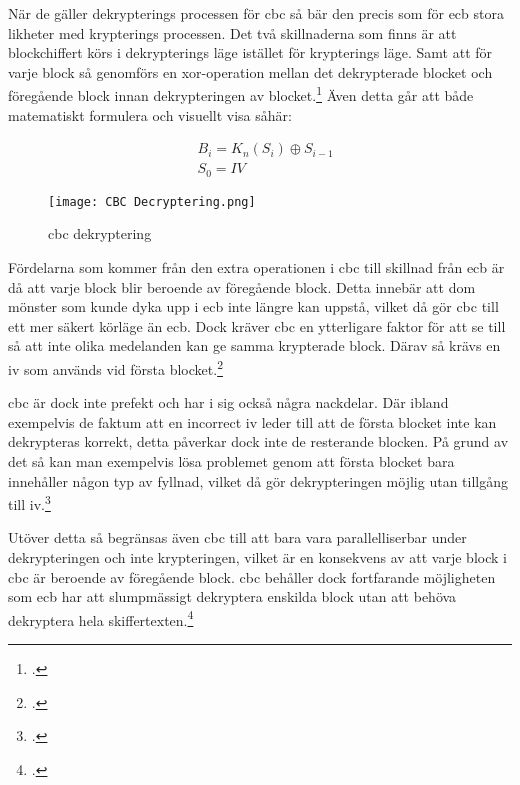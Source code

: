 När de gäller dekrypterings processen för \acrshort{cbc} så bär den precis som för
\acrshort{ecb} stora likheter med krypterings processen. Det två skillnaderna som
finns är att blockchiffert körs i dekrypterings läge istället för krypterings läge.
Samt att för varje block så genomförs en \gls{xor}-operation mellan det dekrypterade
blocket och föregående block innan dekrypteringen av blocket.\footcite{dworkin2001sp}
Även detta går att både matematiskt formulera och visuellt visa såhär:

\begin{equation}
    \label{eq:cbc-decryption}
    \begin{aligned}
        &B_i = K_n(S_i) \oplus S_{i-1}\\\nonumber
        &S_0 = IV
    \end{aligned}
\end{equation}

\begin{figure}[H]
    \texttt{[image: CBC Decryptering.png]}
    \caption{\acrlong{cbc} dekryptering}
    \label{fig:cbc-mode-dec}
\end{figure}

Fördelarna som kommer från den extra operationen i \acrshort{cbc} till skillnad
från \acrshort{ecb} är då att varje block blir beroende av föregående block.
Detta innebär att dom mönster som kunde dyka upp i \acrshort{ecb} inte längre
kan uppstå, vilket då gör \acrshort{cbc} till ett mer säkert körläge än \acrshort{ecb}.
Dock kräver \acrshort{cbc} en ytterligare faktor för att se till så att inte olika medelanden
kan ge samma krypterade block. Därav så krävs en \acrfull{iv} som används vid första
blocket.\footcite{dworkin2001sp}

\acrshort{cbc} är dock inte prefekt och har i sig också några nackdelar. Där ibland
exempelvis de faktum att en incorrect \acrshort{iv} leder till att de första blocket
inte kan dekrypteras korrekt, detta påverkar dock inte de resterande blocken. På grund
av det så kan man exempelvis lösa problemet genom att första blocket bara innehåller
någon typ av fyllnad, vilket då gör dekrypteringen möjlig utan tillgång till \acrshort{iv}.\footcite{dworkin2001sp}

Utöver detta så begränsas även \acrshort{cbc} till att bara vara parallelliserbar under
dekrypteringen och inte krypteringen, vilket är en konsekvens av att varje block i \acrshort{cbc}
är beroende av föregående block. \acrshort{cbc} behåller dock fortfarande möjligheten
som \acrshort{ecb} har att slumpmässigt dekryptera enskilda block utan att behöva
dekryptera hela skiffertexten.\footcite{dworkin2001sp}

